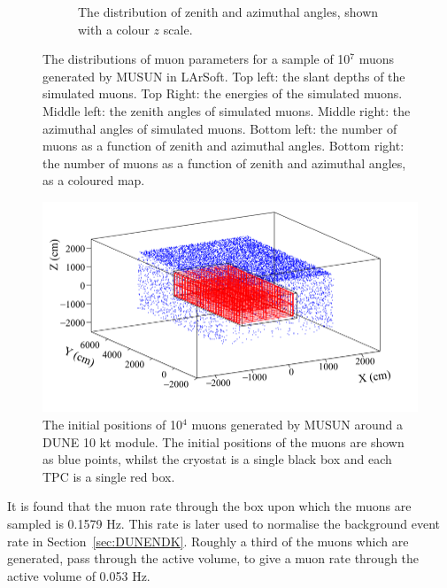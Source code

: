 \begin{figure}
\begin{subfigure}{0.45\textwidth}
    \caption{The distribution of zenith and azimuthal angles, shown with a colour $z$ scale.}
  \end{subfigure}
  \caption[The distributions of muon parameters for a sample of 10$^7$ muons generated by MUSUN in LArSoft]
          {The distributions of muon parameters for a sample of 10$^7$ muons generated by MUSUN in LArSoft. Top left: the slant depths of the simulated muons. Top Right: the energies of the simulated muons. Middle left: the zenith angles of simulated muons. Middle right: the azimuthal angles of simulated muons. Bottom left: the number of muons as a function of zenith and azimuthal angles. Bottom right: the number of muons as a function of zenith and azimuthal angles, as a coloured map.}
  \label{fig:MUSUNIncorp}
\end{figure}

\begin{figure}
  \centering
  \includegraphics[width=\textwidth]{MuonPosCan}
  \caption[The initial positions of 10$^4$ muons generated by MUSUN around a DUNE 10 kt module]
          {The initial positions of 10$^4$ muons generated by MUSUN around a DUNE 10 kt module. The initial positions of the muons are shown as blue points, whilst the cryostat is a single black box and each TPC is a single red box.}
  \label{fig:10ktPos}
\end{figure}

It is found that the muon rate through the box upon which the muons are sampled is 0.1579 Hz. This rate is later used to normalise the background event rate in Section~\ref{sec:DUNENDK}. Roughly a third of the muons which are generated, pass through the active volume, to give a muon rate through the active volume of 0.053 Hz. \\ 

